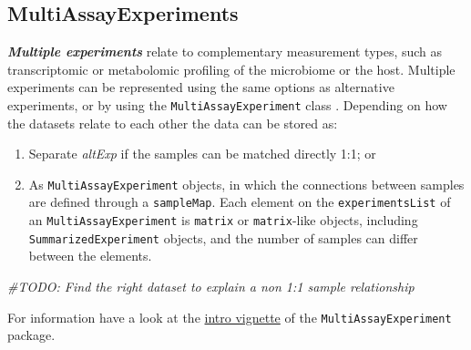 \documentclass[
]{book}
\newenvironment{Shaded}{\begin{snugshade}}{\end{snugshade}}
\newcommand{\CommentTok}[1]{\textcolor[rgb]{0.56,0.35,0.01}{\textit{#1}}}
\providecommand{\tightlist}{%
  \setlength{\itemsep}{0pt}\setlength{\parskip}{0pt}}
\begin{document}
\hypertarget{mae}{%
\subsection{MultiAssayExperiments}\label{mae}}

\emph{\textbf{Multiple experiments}} relate to complementary measurement types,
such as transcriptomic or metabolomic profiling of the microbiome or
the host. Multiple experiments can be represented using the same
options as alternative experiments, or by using the
\texttt{MultiAssayExperiment} class \citep{Ramos2017}. Depending on how the
datasets relate to each other the data can be stored as:

\begin{enumerate}
\def\labelenumi{\arabic{enumi}.}
\tightlist
\item
  Separate \emph{altExp} if the samples can be matched directly 1:1; or
\item
  As \texttt{MultiAssayExperiment} objects, in which the connections between
  samples are defined through a \texttt{sampleMap}. Each element on the
  \texttt{experimentsList} of an \texttt{MultiAssayExperiment} is \texttt{matrix} or
  \texttt{matrix}-like objects, including \texttt{SummarizedExperiment} objects, and
  the number of samples can differ between the elements.
\end{enumerate}

\begin{Shaded}
\begin{Highlighting}[]
\CommentTok{\#TODO: Find the right dataset to explain a non 1:1 sample relationship}
\end{Highlighting}
\end{Shaded}

For information have a look at the \href{https://bioconductor.org/packages/release/bioc/vignettes/MultiAssayExperiment/inst/doc/MultiAssayExperiment.html}{intro vignette} of the \texttt{MultiAssayExperiment} package.
\end{document}
